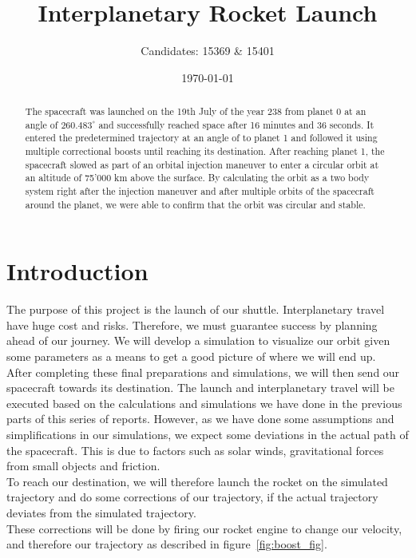 \documentclass[reprint,english,notitlepage]{revtex4-2}
\begin{document}
\title{Interplanetary Rocket Launch}
\author{Candidates: 15369 \& 15401}
\date{\today}

\begin{abstract}
    The spacecraft was launched on the 19th July of the year 238 from planet 0 at an angle of $260.483^{\circ}$ and successfully reached space after 16 minutes and 36 seconds.
    It entered the predetermined trajectory at an angle of to planet 1 and followed it using multiple correctional boosts until reaching its destination.
    After reaching planet 1, the spacecraft slowed as part of an orbital injection maneuver to enter a circular orbit at an altitude of 75'000 km above the surface.
    By calculating the orbit as a two body system right after the injection maneuver and after multiple orbits of the spacecraft around the planet, we were able to confirm that the orbit was circular and stable.
\end{abstract}
\maketitle

\section{Introduction} \label{sec:introduction}
The purpose of this project is the launch of our shuttle.
Interplanetary travel have huge cost and risks.
Therefore, we must guarantee success by planning ahead of our journey.
We will develop a simulation to visualize our orbit given some parameters as a means to get a good picture of where we will end up.\\

After completing these final preparations and simulations, we will then send our spacecraft towards its destination.
The launch and interplanetary travel will be executed based on the calculations and simulations we have done in the previous parts of this series of reports.
However, as we have done some assumptions and simplifications in our simulations, we expect some deviations in the actual path of the spacecraft.
This is due to factors such as solar winds, gravitational forces from small objects and friction.\\
To reach our destination, we will therefore launch the rocket on the simulated trajectory and do some corrections of our trajectory, if the actual trajectory deviates from the simulated trajectory.\\
These corrections will be done by firing our rocket engine to change our velocity, and therefore our trajectory as described in figure~\ref{fig:boost_fig}.
\end{document}

